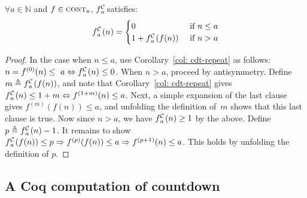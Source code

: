 \begin{thm} \label{thm: cdt-recursion}
	$\forall a\in \mathbb{N}$ and $f\in \text{\scshape{cont}}_{a}$, $\cdt{f}{a}$ satisfies:
	\begin{equation*}
	\cdt{f}{a}(n) = \begin{cases}
	0 & \text{ if } n \le a \\ 1 + \cdt{f}{a}(f(n)) & \text{ if } n > a 
	\end{cases}
	\end{equation*}
\end{thm}
\begin{proof}
In the case when $n \le a$, use Corollary~\ref{col: cdt-repeat} as follows: \lb
$n = f^{(0)}(n)\le~a \iff \cdt{f}{a}(n)\le 0$.
When $n > a$, proceed by antisymmetry.
Define $m \triangleq \cdt{f}{a}(f(n))$, and note that
Corollary~\ref{col: cdt-repeat} gives
$\cdt{f}{a}(n)\le 1+m \iff f^{(1+m)}(n) \le a$.
Next, a simple expansion of the last clause gives $f^{(m)}(f(n)) \le a$,
and unfolding the definition of~$m$ shows that this last clause is true.
Now since $n > a$, we have $\cdt{f}{a}(n)\ge 1$ by the above.
Define $p \triangleq \cdt{f}{a}(n) - 1$.
It remains to show $\cdt{f}{a}(f(n))\le p \Rightarrow 
\linebreak f^{(p)}(f(n))\le a \Rightarrow f^{(p+1)}(n)\le a$. This holds by 
unfolding the definition of $p$.
\end{proof}


\subsection{A Coq computation of countdown}

